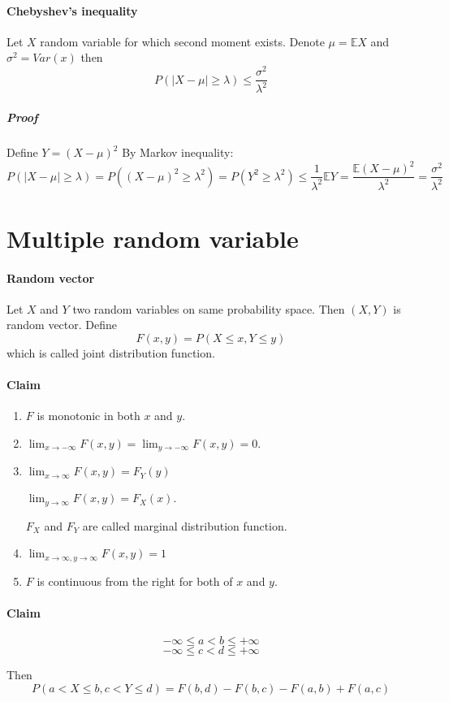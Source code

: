 \paragraph{Chebyshev's inequality}
Let $X$ random variable for which second moment exists. Denote $\mu = \mathbb{E} X$ and $\sigma^2 = Var(x)$ then
$$P(|X-\mu| \geq \lambda) \leq \frac{\sigma^2}{\lambda^2}$$

\subparagraph{Proof}
Define $Y = (X-\mu)^2$
By Markov inequality:
$$P(|X-\mu|\geq \lambda) = P\left( (X-\mu)^2 \geq \lambda^2 \right) = P\left( Y^2 \geq \lambda^2 \right) \leq \frac{1}{\lambda^2} \mathbb{E} Y = \frac{\mathbb{E} (X-\mu)^2}{\lambda^2} = \frac{\sigma^2}{\lambda^2}$$
\section{Multiple random variable}
\paragraph{Random vector}
Let $X$ and $Y$ two random variables on same probability space. Then $(X,Y)$ is random vector. Define
$$F(x,y) = P(X \leq x, Y \leq y)$$
which is called joint distribution function.
\paragraph{Claim}
\begin{enumerate}
	\item  $F$ is monotonic in both $x$ and $y$.
	\item  $\lim_{x\to -\infty} F(x,y)=\lim_{y\to -\infty} F(x,y) = 0$.
	\item  $\lim_{x\to \infty} F(x,y)= F_Y(y)$
	
	$\lim_{y\to \infty} F(x,y) = F_X(x)$.
	
	$F_X$ and $F_Y$ are called marginal distribution function.
	\item  $\lim_{x\to \infty, y\to \infty} F(x,y)= 1$
	
	\item  $F$ is continuous from the right for both of $x$ and $y$.
\end{enumerate}
\paragraph{Claim}
$$-\infty \leq a < b \leq +\infty$$
$$-\infty \leq c < d \leq +\infty$$

Then
$$P(a<X\leq b, c < Y \leq d) = F(b,d) - F(b,c) - F(a,b) + F(a,c)$$


